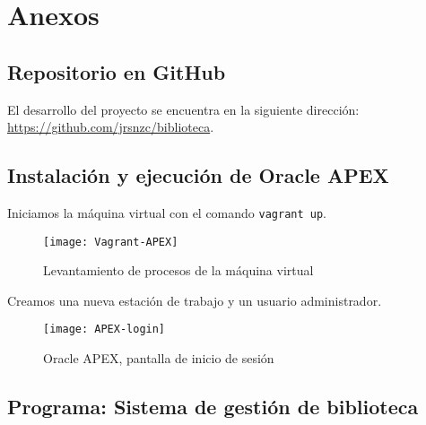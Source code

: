 \section{Anexos}
\subsection{Repositorio en GitHub}
El desarrollo del proyecto se encuentra en la siguiente dirección: \url{https://github.com/jrsnzc/biblioteca}.

\subsection{Instalación y ejecución de Oracle APEX}
Iniciamos la máquina virtual con el comando \lstinline$vagrant up$.
\begin{figure}[H]
  \centering
  \texttt{[image: Vagrant-APEX]}
  \caption{Levantamiento de procesos de la máquina virtual}
  \label{fig:vagrant-apex}
\end{figure}

Creamos una nueva estación de trabajo y un usuario administrador.
\begin{figure}[H]
  \centering
  \texttt{[image: APEX-login]}
  \caption{Oracle APEX, pantalla de inicio de sesión}
  \label{fig:apex-login}
\end{figure}

\subsection{Programa: Sistema de gestión de biblioteca}

